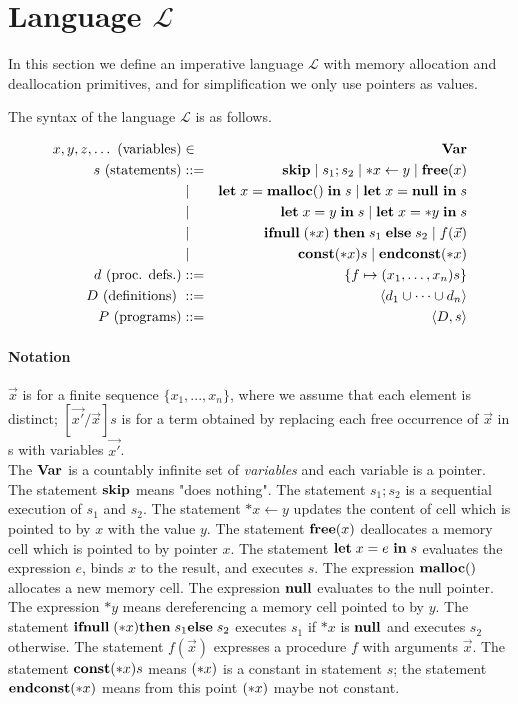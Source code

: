 \section{Language \(\mathcal{L}\)}\label{sec:language}
In this section we define an imperative language \(\mathcal{L}\) with
memory allocation and deallocation primitives, and for simplification
we only use pointers as values.
 
The syntax of the language \(\mathcal{L}\) is as follows.

\begin{eqnarray*}
  x,y,z,\dots \mbox{ (variables)} &\in& \mathbf{Var}\\
  s \mbox{ (statements)} & ::= &  \mathbf{skip} \mid s_{1};s_{2} \mid *x \leftarrow y \mid \mathbf{free}(x) \\
  & \mid & \mathbf{let}\; x = \mathbf{malloc()}\; \mathbf{in}\; s \mid \mathbf{let}\; x = \mathbf{null}\ \mathbf{in}\; s  \\
  & \mid & \mathbf{let}\; x = y \; \mathbf{in}\; s \mid   \mathbf{let}\; x = *y \; \mathbf{in}\; s \\
  & \mid & \mathbf{ifnull}\;(*x) \; \mathbf{then}\; s_{1}\; \mathbf{else}\; s_{2} \mid f(\vec{x})\\
  & \mid & \mathbf{const}(*x) s \mid \mathbf{endconst}(*x)  \\
  d \mbox{ (proc. defs.)} & ::= & \{f \mapsto (x_1,\dots,x_n)s\}\\
  D \mbox{ (definitions) } &::=& \langle d_1 \cup \dots \cup d_n \rangle\\
  P \mbox{ (programs)} &::=& \langle D, s \rangle\\
\end{eqnarray*}

\paragraph{Notation} \(\vec{x}\) is for a finite sequence \(\{x_1,...,x_n\}\),
where we assume that each element is distinct; \([\vec{x'}/\vec{x}]s\)
is for a term obtained by replacing each free occurrence of
\(\vec{x}\) in s with variables \(\vec{x'}\).\\

The \(\mathbf{Var}\) is a countably infinite set of \emph{variables} and each
variable is a pointer. The statement \(\mathbf{skip}\) means "does nothing".
The statement \(s_1;s_2\) is a sequential execution of \(s_1\) and
\(s_2\). The statement \(*x \leftarrow y\) updates the content of cell
which is pointed to by \(x\) with the value \(y\). The statement
\(\mathbf{free}(x)\) deallocates a memory cell which is pointed to by pointer
\(x\). The statement \(\mathbf{let}\; x = e\ \mathbf{in}\; s\) evaluates the expression
\(e\), binds \(x\) to the result, and executes \(s\). The expression
\(\mathbf{malloc}()\) allocates a new memory cell. The expression \(\mathbf{null}\)
evaluates to the null pointer. The expression \(*y\) means
dereferencing a memory cell pointed to by \(y\). The statement
\(\mathbf{ifnull}\;(*x) \mathbf{then}\; s_1 \mathbf{else}\; s_2\) executes \(s_1\) if \(*x\) is
\(\mathbf{null}\) and executes \(s_2\) otherwise. The statement \(f(\vec{x})\)
expresses a procedure \(f\) with arguments \(\vec{x}\). The statement
\(\mathbf{const}(*x) s\) means \((*x)\) is a constant in statement \(s\); the
statement \(\mathbf{endconst}(*x)\) means from this point \((*x)\) maybe not
constant.

